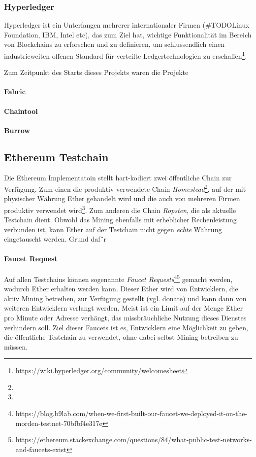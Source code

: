 \subsubsection{Hyperledger}
Hyperledger ist ein Unterfangen mehrerer internationaler Firmen (\#TODOLinux Foundation, IBM, Intel etc), das zum Ziel hat, wichtige Funktionalität im Bereich von Blockchains zu erforschen und zu definieren, um schlussendlich einen industrieweiten offenen Standard für verteilte Ledgertechnologien zu erschaffen\footnote{https://wiki.hyperledger.org/community/welcomesheet}.

Zum Zeitpunkt des Starts dieses Projekts waren die Projekte 
\paragraph{Fabric}
\paragraph{Chaintool}
\paragraph{Burrow}

\subsection{Ethereum Testchain}
Die Ethereum Implementatoin stellt hart-kodiert zwei öffentliche Chain zur Verfügung. Zum einen die produktiv verwendete Chain \emph{Homestead}\footnote{}, auf der mit physischer Währung Ether gehandelt wird und die auch von mehreren Firmen produktiv verwendet wird\footnote{}. Zum anderen die Chain \emph{Ropsten}, die als aktuelle Testchain dient. Obwohl das Mining ebenfalls mit erheblicher Rechenleistung verbunden ist, kann Ether auf der Testchain nicht gegen \emph{echte} Währung eingetauscht werden. Grund daf¨r

\paragraph{Faucet Request}
\label{para:Faucet_Request}
Auf allen Testchains können sogenannte \emph{Faucet Requests}\footnote{https://blog.b9lab.com/when-we-first-built-our-faucet-we-deployed-it-on-the-morden-testnet-70bfbf4e317e}\footnote{https://ethereum.stackexchange.com/questions/84/what-public-test-networks-and-faucets-exist} gemacht werden, wodurch Ether erhalten werden kann. Dieser Ether wird von Entwicklern, die aktiv Mining betreiben, zur Verfügung gestellt (vgl. donate) und kann dann von weiteren Entwicklern verlangt werden. Meist ist ein Limit auf der Menge Ether pro Minute oder Adresse verhängt, das missbräuchliche Nutzung dieses Dienstes verhindern soll. Ziel dieser Faucets ist es, Entwicklern eine Möglichkeit zu geben, die öffentliche Testchain zu verwendet, ohne dabei selbst Mining betreiben zu müssen.

